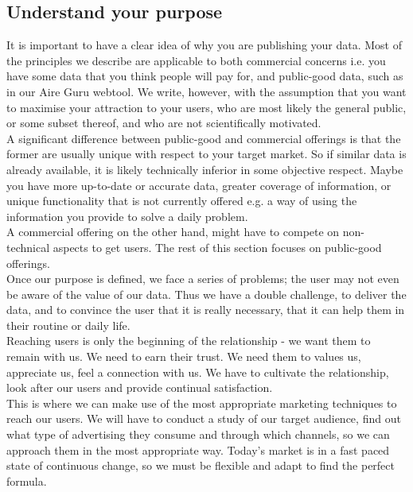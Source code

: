 \subsection{Understand your purpose}

It is important to have a clear idea of why you are publishing your data. Most of the principles
we describe are applicable to both commercial concerns i.e. you have some data that you think
people will pay for, and public-good data, such as in our Aire Guru webtool. We write, however,
with the assumption that you want to maximise your attraction to your users, who are most likely
the general public, or some subset thereof, and who are not scientifically motivated.\\

A significant difference between public-good and commercial offerings is that the former are usually
unique with respect to your target market. So if similar data is already available, it is likely technically
inferior in some objective respect. Maybe you have more up-to-date or accurate data,
greater coverage of information, or unique functionality that is not currently offered e.g. a way of using the
information you provide to solve a daily problem.\\

A commercial offering on the other hand, might have to compete on
non-technical aspects to get users. The rest of this section focuses on public-good offerings. \\

Once our purpose is defined, we face a series of problems; the user may not even be aware of the value of our data.
Thus we have a double challenge, to deliver the data, and to convince the user that it is really necessary, that it can help them in their routine or daily life.\\

Reaching users is only the beginning of the relationship - we want them to remain with us.
We need to earn their trust. We need them to values us, appreciate us, feel a connection with us.
We have to cultivate the relationship, look after our users and provide continual satisfaction.\\

This is where we can make use of the most appropriate marketing techniques to reach our users.
We will have to conduct a study of our target audience, find out what type of advertising they consume and through which channels,
so we can approach them in the most appropriate way. Today's market is in a fast paced state of continuous change,
so we must be flexible and adapt to find the perfect formula. \\

